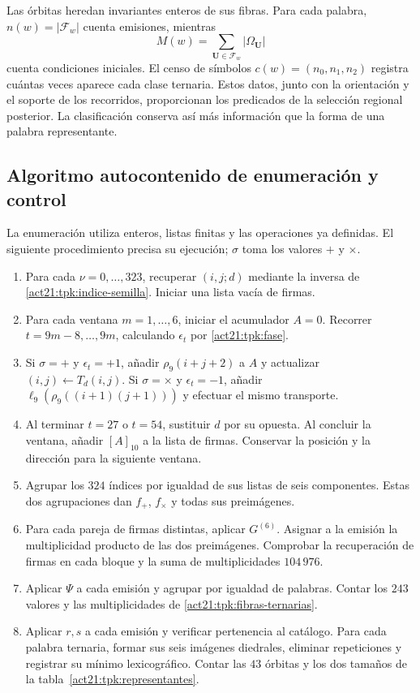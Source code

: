 Las órbitas heredan invariantes enteros de sus fibras. Para cada palabra,
\(n(w)=|\mathcal F_w|\) cuenta emisiones, mientras
\[
 M(w)=\sum_{\mathbf U\in\mathcal F_w}|\Omega_{\mathbf U}|
\]
cuenta condiciones iniciales. El censo de símbolos
\(c(w)=(n_0,n_1,n_2)\) registra cuántas veces aparece cada clase ternaria.
Estos datos, junto con la orientación y el soporte de los recorridos,
proporcionan los predicados de la selección regional posterior. La
clasificación conserva así más información que la forma de una palabra
representante.

\subsection{Algoritmo autocontenido de enumeración y control}
\label{act21:tpk:algoritmo}

La enumeración utiliza enteros, listas finitas y las operaciones ya definidas.
El siguiente procedimiento precisa su ejecución; \(\sigma\) toma los valores
\(+\) y \(\times\).

\begin{enumerate}
\item Para cada \(\nu=0,\ldots,323\), recuperar \((i,j;d)\) mediante
la inversa de \eqref{act21:tpk:indice-semilla}. Iniciar una lista vacía de firmas.
\item Para cada ventana \(m=1,\ldots,6\), iniciar el acumulador \(A=0\).
Recorrer \(t=9m-8,\ldots,9m\), calculando \(\epsilon_t\) por
\eqref{act21:tpk:fase}.
\item Si \(\sigma=+\) y \(\epsilon_t=+1\), añadir
\(\rho_9(i+j+2)\) a \(A\) y actualizar
\((i,j)\leftarrow T_d(i,j)\). Si \(\sigma=\times\) y
\(\epsilon_t=-1\), añadir
\(\ell_9(\rho_9((i+1)(j+1)))\) y efectuar el mismo transporte.
\item Al terminar \(t=27\) o \(t=54\), sustituir \(d\) por su opuesta.
Al concluir la ventana, añadir \([A]_{10}\) a la lista de firmas.
Conservar la posición y la dirección para la siguiente ventana.
\item Agrupar los \(324\) índices por igualdad de sus listas de seis
componentes. Estas dos agrupaciones dan \(f_+\), \(f_\times\) y todas
sus preimágenes.
\item Para cada pareja de firmas distintas, aplicar \(G^{(6)}\).
Asignar a la emisión la multiplicidad producto de las dos preimágenes.
Comprobar la recuperación de firmas en cada bloque y la suma de
multiplicidades \(104\,976\).
\item Aplicar \(\Psi\) a cada emisión y agrupar por igualdad de palabras.
Contar los \(243\) valores y las multiplicidades de
\eqref{act21:tpk:fibras-ternarias}.
\item Aplicar \(r,s\) a cada emisión y verificar pertenencia al catálogo.
Para cada palabra ternaria, formar sus seis imágenes diedrales, eliminar
repeticiones y registrar su mínimo lexicográfico. Contar las \(43\)
órbitas y los dos tamaños de la tabla~\ref{act21:tpk:representantes}.
\end{enumerate}

